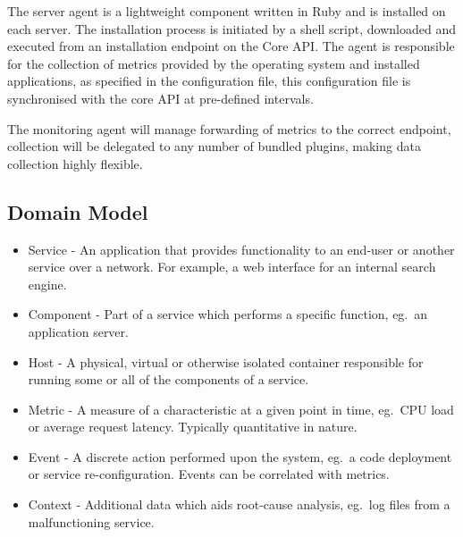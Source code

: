 \documentclass{cshonours}
\begin{document}
The server agent is a lightweight component written in Ruby and is installed on each server. The installation process is initiated by a shell script, downloaded and executed from an installation endpoint on the Core API. The agent is responsible for the collection of metrics provided by the operating system and installed applications, as specified in the configuration file, this configuration file is synchronised with the core API at pre-defined intervals.

The monitoring agent will manage forwarding of metrics to the correct endpoint, collection will be delegated to any number of bundled plugins, making data collection highly flexible.

\subsection{Domain Model}

\begin{itemize}
  \item Service - An application that provides functionality to an end-user or another service over a network. For example, a web interface for an internal search engine.
  \item Component - Part of a service which performs a specific function, eg.\ an application server.
  \item Host - A physical, virtual or otherwise isolated container responsible for running some or all of the components of a service.
  \item Metric - A measure of a characteristic at a given point in time, eg.\ CPU load or average request latency. Typically quantitative in nature.
  \item Event - A discrete action performed upon the system, eg.\ a code deployment or service re-configuration. Events can be correlated with metrics.
  \item Context - Additional data which aids root-cause analysis, eg.\ log files from a malfunctioning service.
\end{itemize}
\end{document}

